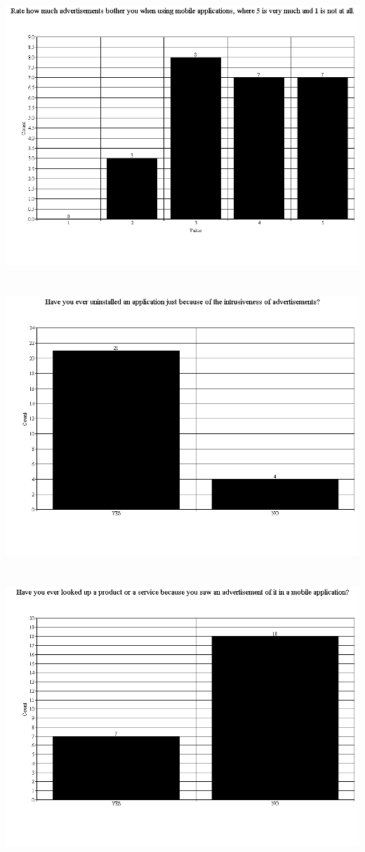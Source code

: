 \documentclass[twoside,11pt]{Latex/Classes/PhDthesisPSnPDF}
\begin{document}
\chapter{}
\includegraphics[scale=0.5]{Images/q2}
\chapter{}
\includegraphics[scale=0.5]{Images/q4}
\chapter{}
\includegraphics[scale=0.5]{Images/q5}
\end{document}
